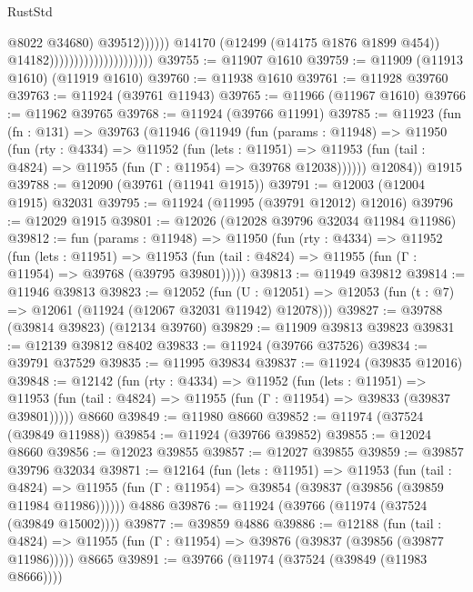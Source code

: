 \begin{lexlean}{RustStd}
\begin{coremodule}
{\begin{coremodule}
{{{{{{{{{{{{{{{{{{{{{{{{{{{{{{{{{{{{{{{{{{{{{{{{{{{{{{{{{{{{{{{{{{{{{{{{{{{{{{{{                                                            @8022
                                                            @34680)
                                                          @39512))))))
                                              @14170
                                              (@12499 (@14175 @1876 @1899 @454))
                                              @14182)))))))))))))))))))))
@39755 := @11907 @1610
@39759 := @11909 (@11913 @1610) (@11919 @1610)
@39760 := @11938 @1610
@39761 := @11928 @39760
@39763 := @11924 (@39761 @11943)
@39765 := @11966 (@11967 @1610)
@39766 := @11962 @39765
@39768 := @11924 (@39766 @11991)
@39785 := @11923
    (fun (fn : @131) =>
    @39763
      (@11946
        (@11949
          (fun (params : @11948) =>
          @11950
            (fun (rty : @4334) =>
            @11952
              (fun (lets : @11951) =>
              @11953 (fun (tail : @4824) => @11955 (fun (Γ : @11954) => @39768 @12038))))))
        @12084))
    @1915
@39788 := @12090 (@39761 (@11941 @1915))
@39791 := @12003 (@12004 @1915) @32031
@39795 := @11924 (@11995 (@39791 @12012) @12016)
@39796 := @12029 @1915
@39801 := @12026 (@12028 @39796 @32034 @11984 @11986)
@39812 := fun (params : @11948) =>
  @11950
    (fun (rty : @4334) =>
    @11952
      (fun (lets : @11951) =>
      @11953 (fun (tail : @4824) => @11955 (fun (Γ : @11954) => @39768 (@39795 @39801)))))
@39813 := @11949 @39812
@39814 := @11946 @39813
@39823 := @12052
    (fun (U : @12051) => @12053 (fun (t : @7) => @12061 (@11924 (@12067 @32031 @11942) @12078)))
@39827 := @39788 (@39814 @39823) (@12134 @39760)
@39829 := @11909 @39813 @39823
@39831 := @12139 @39812 @8402
@39833 := @11924 (@39766 @37526)
@39834 := @39791 @37529
@39835 := @11995 @39834
@39837 := @11924 (@39835 @12016)
@39848 := @12142
    (fun (rty : @4334) =>
    @11952
      (fun (lets : @11951) =>
      @11953 (fun (tail : @4824) => @11955 (fun (Γ : @11954) => @39833 (@39837 @39801)))))
    @8660
@39849 := @11980 @8660
@39852 := @11974 (@37524 (@39849 @11988))
@39854 := @11924 (@39766 @39852)
@39855 := @12024 @8660
@39856 := @12023 @39855
@39857 := @12027 @39855
@39859 := @39857 @39796 @32034
@39871 := @12164
    (fun (lets : @11951) =>
    @11953
      (fun (tail : @4824) =>
      @11955 (fun (Γ : @11954) => @39854 (@39837 (@39856 (@39859 @11984 @11986))))))
    @4886
@39876 := @11924 (@39766 (@11974 (@37524 (@39849 @15002))))
@39877 := @39859 @4886
@39886 := @12188
    (fun (tail : @4824) => @11955 (fun (Γ : @11954) => @39876 (@39837 (@39856 (@39877 @11986)))))
    @8665
@39891 := @39766 (@11974 (@37524 (@39849 (@11983 @8666))))
}}}}}}}}}}}}}}}}}}}}}}}}}}}}}}}}}}}}}}}}}}}}}}}}}}}}}}}}}}}}}}}}}}}}}}}}}}}}}}}}
\end{coremodule}}
\end{coremodule}
\end{lexlean}
